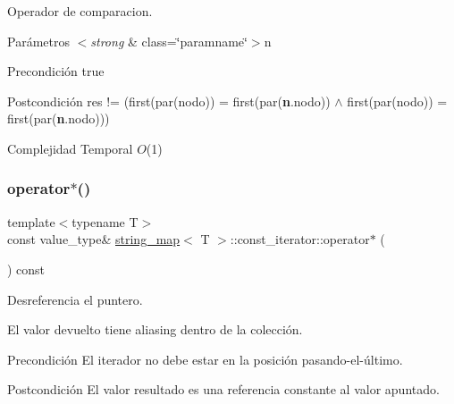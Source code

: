 Operador de comparacion. 


\begin{DoxyParams}{Parámetros}
{\em $<$strong} & class=\char`\"{}paramname\char`\"{}$>$n\\
\hline
\end{DoxyParams}
\begin{DoxyPrecond}{Precondición}
true 
\end{DoxyPrecond}
\begin{DoxyPostcond}{Postcondición}
res != (first(par(nodo)) = first(par({\bfseries n}.nodo)) $\land$ first(par(nodo)) = first(par({\bfseries n}.nodo)))
\end{DoxyPostcond}

\begin{DoxyDescription}
\item[Complejidad Temporal]$O$(1)
\end{DoxyDescription}\mbox{\label{classstring__map_1_1const__iterator_ab66744c4e3de4aebf417e40b3f0142e6}} 
\subsubsection{\texorpdfstring{operator$\ast$()}{operator*()}}
{\footnotesize\ttfamily template$<$typename T$>$ \\
const value\+\_\+type\& \mbox{\hyperlink{classstring__map}{string\+\_\+map}}$<$ T $>$\+::const\+\_\+iterator\+::operator$\ast$ (\begin{DoxyParamCaption}{ }\end{DoxyParamCaption}) const\hspace{0.3cm}{\ttfamily [inline]}}



Desreferencia el puntero. 

El valor devuelto tiene aliasing dentro de la colección.

\begin{DoxyPrecond}{Precondición}
El iterador no debe estar en la posición pasando-\/el-\/último. 
\end{DoxyPrecond}
\begin{DoxyPostcond}{Postcondición}
El valor resultado es una referencia constante al valor apuntado.
\end{DoxyPostcond}

